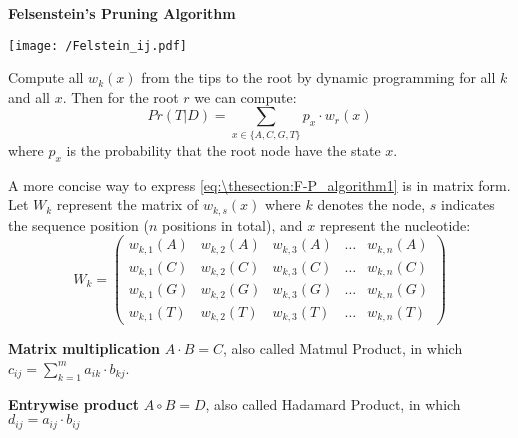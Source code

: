\documentclass[12pt]{book}
\begin{document}
\begin{defn}{\textbf{Felsenstein's Pruning Algorithm}}
                    \begin{center}
                        \texttt{[image: /Felstein\_ij.pdf]}
                    \end{center}
            
                    Compute all $w_k(x)$ from the tips to the root by dynamic programming for all $k$ and all $x$. Then for the root $r$ we can compute:
                        \begin{equation}
                            Pr(T|D) = \sum_{x \in \{ A, C, G, T\}} p_x \cdot w_r(x)
                        \end{equation}
                    where $p_x$ is the probability that the root node have the state $x$.
                \end{defn}
        
        A more concise way to express \eqref{eq:\thesection:F-P_algorithm1} is in matrix form. Let $W_k$ represent the matrix of $w_{k,s}(x)$ where $k$ denotes the node, $s$ indicates the sequence position ($n$ positions in total), and $x$ represent the nucleotide:
        \begin{equation*}
            W_k = \left(
                \begin{matrix}
                    w_{k,1}(A) & w_{k,2}(A) & w_{k,3}(A) & \dots & w_{k,n}(A) \\
                    w_{k,1}(C) & w_{k,2}(C) & w_{k,3}(C) & \dots & w_{k,n}(C) \\
                    w_{k,1}(G) & w_{k,2}(G) & w_{k,3}(G) & \dots & w_{k,n}(G) \\
                    w_{k,1}(T) & w_{k,2}(T) & w_{k,3}(T) & \dots & w_{k,n}(T)
                \end{matrix}
            \right)
        \end{equation*}
        
        \textbf{Matrix multiplication}
        $A \cdot B = C$, also called Matmul Product, in which $c_{ij} = \sum_{k=1}^m a_{ik} \cdot b_{kj}$.

        \textbf{Entrywise product}
        $A \circ B = D$, also called Hadamard Product, in which $d_{ij} = a_{ij} \cdot b_{ij}$
\end{document}
